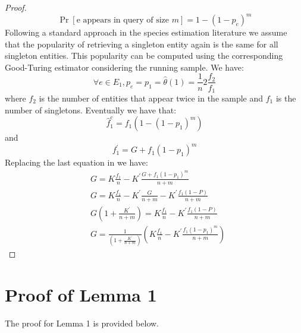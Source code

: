 \begin{proof}
\begin{equation}
\Pr[\mbox{e appears in query of size $m$}] = 1 - (1-p_e)^m
\end{equation}
Following a standard approach in the species estimation literature we assume that the popularity of retrieving a singleton entity again is the same for all singleton entities. This popularity can be computed using the corresponding Good-Turing estimator considering the running sample. We have:
\begin{equation}
\forall e \in E_1, p_e = p_1 = \hat{\theta}(1) = \frac{1}{n}2\frac{f_2}{f_1}
\end{equation}
where $f_2$ is the number of entities that appear twice in the sample and $f_1$ is the number of singletons. 
Eventually we have that:
\begin{equation}
\hat{f}_1^c = f_1(1 - (1-p_1)^m)
\end{equation}
and
\begin{equation}
f^{\prime}_1 = G + f_1(1-p_1)^m
\end{equation}
Replacing the last equation in  we have:
\begin{align}
&G = K\frac{f_1}{n} - K^{\prime}\frac{G + f_1(1-p_1)^m}{n+m} \nonumber \\
&G = K\frac{f_1}{n} - K^{\prime}\frac{G}{n+m} - K^{\prime}\frac{f_1(1- P)}{n+m} \nonumber \\
&G(1 + \frac{K^{\prime}}{n+m}) = K\frac{f_1}{n} - K^{\prime}\frac{f_1(1- P)}{n+m} \nonumber \\
&G = \frac{1}{(1 + \frac{K^{\prime}}{n+m})}(K\frac{f_1}{n} - K^{\prime}\frac{f_1(1-p_1)^m}{n+m}) \nonumber
\end{align}
\end{proof}

\section{Proof of Lemma 1}
\label{sec:prle1}

The proof for Lemma 1 is provided below.

